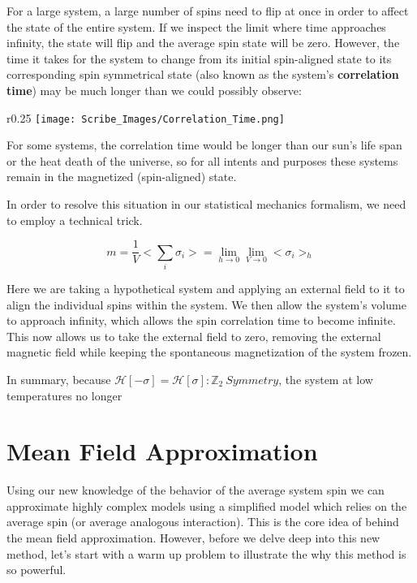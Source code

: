 \documentclass{article}
\newcommand{\sigi}{\sigma_{i}}
\begin{document}
For a large system, a large number of spins need to flip at once in order to affect the state of the entire system.  If we inspect the limit where time approaches infinity, the state will flip and the average spin state will be zero.  However, the time it takes for the system to change from its initial spin-aligned state to its corresponding spin symmetrical state (also known as the system's \textbf{correlation time}) may be much longer than we could possibly observe: 

\begin{wrapfigure}{r}{0.25\textwidth}
	\centering
	\texttt{[image: Scribe\_Images/Correlation\_Time.png]}
\end{wrapfigure}

For some systems, the correlation time would be longer than our sun's life span or the heat death of the universe, so for all intents and purposes these systems remain in the magnetized (spin-aligned) state.

In order to resolve this situation in our statistical mechanics formalism, we need to employ a technical trick.  

$$m=\frac{1}{V}<\sum_{i}\sigi>=\lim\limits_{h\rightarrow0}\lim\limits_{V\rightarrow0}<\sigi>_{h}$$

Here we are taking a hypothetical system and applying an external field to it to align the individual spins within the system.  We then allow the system's volume to approach infinity, which allows the spin correlation time to become infinite.  This now allows us to take the external field to zero, removing the external magnetic field while keeping the spontaneous magnetization of the system frozen.  

In summary, because $\mathcal{H}[-\sigma]=\mathcal{H}[\sigma]:\mathbb{Z}_{2}\ Symmetry$, the system at low temperatures no longer 


\section{Mean Field Approximation}

Using our new knowledge of the behavior of the average system spin we can approximate highly complex models using a simplified model which relies on the average spin (or average analogous interaction).  This is the core idea of behind the mean field approximation.  However, before we delve deep into this new method, let's start with a warm up problem to illustrate the why this method is so powerful.
\end{document}
